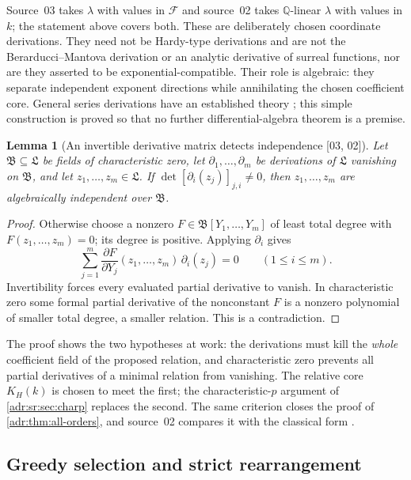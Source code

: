 \documentclass[11pt,letterpaper]{article}
\numberwithin{equation}{section}
\newtheorem{lemma}[lemma]{Lemma}
\theoremstyle{definition}
\theoremstyle{remark}
\newcommand{\Q}{\mathbb Q}
\newcommand{\src}[1]{\textup{[#1]}}%
\begin{document}
Source~03 takes $\lambda$ with values in $\mathcal F$ and source~02 takes
$\Q$-linear $\lambda$ with values in $k$; the statement above covers both.
These are deliberately chosen coordinate derivations. They need not be
Hardy-type derivations and are not the Berarducci--Mantova derivation or an
analytic derivative of surreal functions, nor are they asserted to be
exponential-compatible. Their role is algebraic: they separate independent
exponent directions while annihilating the chosen coefficient core. General
series derivations have an established theory \cite{KM}; this simple
construction is proved so that no further differential-algebra theorem is a
premise.

\begin{lemma}[An invertible derivative matrix detects independence \src{03, 02}]
\label{adr:sr:lem:jacobian}
Let $\mathfrak B\subseteq\mathfrak L$ be fields of characteristic zero, let
$\partial_1,\ldots,\partial_m$ be derivations of $\mathfrak L$ vanishing on
$\mathfrak B$, and let $z_1,\ldots,z_m\in\mathfrak L$. If
$\det[\partial_i(z_j)]_{j,i}\ne0$, then $z_1,\ldots,z_m$ are algebraically
independent over $\mathfrak B$.
\end{lemma}
\begin{proof}
Otherwise choose a nonzero $F\in\mathfrak B[Y_1,\ldots,Y_m]$ of least total
degree with $F(z_1,\ldots,z_m)=0$; its degree is positive. Applying
$\partial_i$ gives
\[
 \sum_{j=1}^m\frac{\partial F}{\partial Y_j}(z_1,\ldots,z_m)\,\partial_i(z_j)=0
 \qquad(1\le i\le m).
\]
Invertibility forces every evaluated partial derivative to vanish. In
characteristic zero some formal partial derivative of the nonconstant $F$ is
a nonzero polynomial of smaller total degree, a smaller relation. This is a
contradiction.
\end{proof}

The proof shows the two hypotheses at work: the derivations must kill the
\emph{whole} coefficient field of the proposed relation, and characteristic
zero prevents all partial derivatives of a minimal relation from vanishing.
The relative core $K_H(k)$ is chosen to meet the first; the characteristic-$p$
argument of \cref{adr:sr:sec:charp} replaces the second. The same criterion
closes the proof of \cref{adr:thm:all-orders}, and source~02 compares it with
the classical form \cite[Theorem~6]{BMS}.

\subsection{Greedy selection and strict rearrangement}
\end{document}
